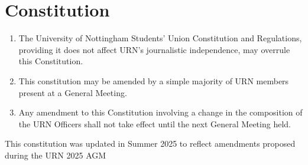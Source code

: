 \section{Constitution}

\begin{enumerate}[label*=\thesection.\arabic*.]
    \item The University of Nottingham Students' Union Constitution and Regulations, providing it does not affect URN's journalistic independence, may overrule this Constitution.
    \item This constitution may be amended by a simple majority of URN members present at a General Meeting.
    \item Any amendment to this Constitution involving a change in the composition of the URN Officers shall not take effect until the next General Meeting held.
\end{enumerate}

\bigbreak

This constitution was updated in Summer 2025 to reflect amendments proposed during the URN 2025 AGM
